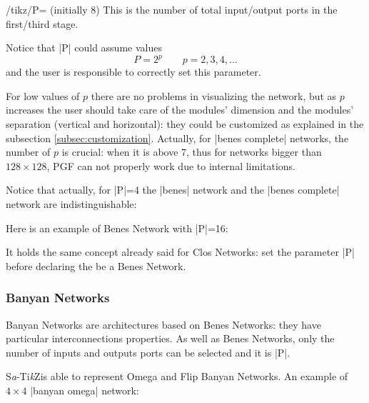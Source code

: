 \documentclass{ltxdoc}
\newcommand\Tikz{Ti\textit kZ}
\newcommand{\saTikZ}{S\textit{a}-\Tikz}
\begin{document}
\begin{key}{/tikz/P= (initially 8)}
    This is the number of total input/output ports in the first/third stage.
\end{key}

Notice that |P| could assume values
\[P=2^p \qquad p=2,3,4,\ldots\]
and the user is responsible to correctly set this parameter.

For low values of $p$ there are no problems in visualizing the network, but as $p$ increases the user should take care of the modules' dimension  and the modules' separation (vertical and horizontal): they could be customized as explained in the subsection \ref{subsec:customization}. Actually, for |benes complete| networks, the number of $p$ is crucial: when it is above 7, thus for networks bigger than  $128\times 128$, PGF can not properly work due to internal limitations.

Notice that actually, for |P|=4 the |benes| network and the |benes complete| network are indistinguishable:
\begin{codeexample}[]
\begin{tikzpicture}
\tikzset{module size=0.5cm,
 pin length factor=0.5,
 module ysep=1}
 \node[P=4,benes] {};
 \begin{scope}[xshift=6cm]
     \node[module xsep=2.5,P=4,benes complete]{};
 \end{scope}
\end{tikzpicture}
\end{codeexample}


Here is an example of Benes Network with |P|=16:
\begin{codeexample}[]
\begin{tikzpicture}
    \node[P=16,benes] {};
\end{tikzpicture}
\end{codeexample}

It holds the same concept already said for Clos Networks: set the parameter |P| before declaring the  be a Benes Network.


\subsubsection{Banyan Networks}
\label{subsubsec:banyan}
Banyan Networks are architectures based on Benes Networks: they have particular interconnections properties. As well as Benes Networks, only the number of inputs and outputs ports can be selected and it is |P|.

\saTikZ is able to represent Omega and Flip Banyan Networks. An example of $4\times 4$ |banyan omega| network:
\begin{codeexample}[]
\begin{tikzpicture}
    \node[P=4,banyan omega] {};
\end{tikzpicture}
\end{codeexample}
\end{document}
